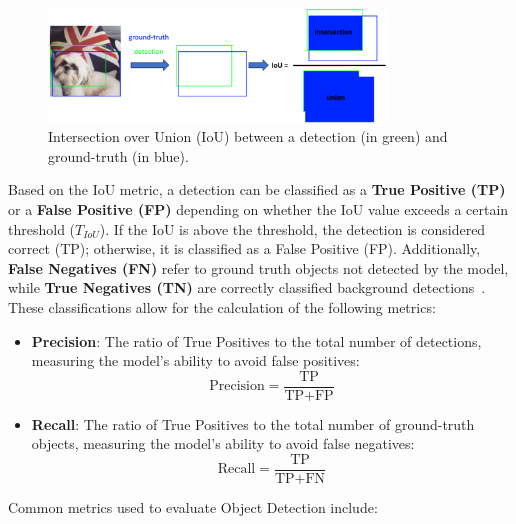 \documentclass[12pt,oneside]{book} %
\begin{document}
\begin{figure}[H]
    \centering
    \includegraphics[width=0.8\textwidth]{figures/iou.png}
    \caption{Intersection over Union (IoU) between a detection (in green) and ground-truth (in blue).~\cite{huggingface2023objectdetection}}\label{fig:iou-metric}
\end{figure}

Based on the IoU metric, a detection can be classified as a \textbf{True
    Positive (TP)} or a \textbf{False Positive (FP)} depending on whether the IoU
value exceeds a certain threshold ($T_{IoU}$). If the IoU is above the
threshold, the detection is considered correct (TP); otherwise, it is
classified as a False Positive (FP). Additionally, \textbf{False Negatives
    (FN)} refer to ground truth objects not detected by the model, while
\textbf{True Negatives (TN)} are correctly classified background
detections~\cite{huggingface2023objectdetection}. These classifications allow
for the calculation of the following metrics:

\begin{itemize}
    \item \textbf{Precision}: The ratio of True Positives to the total number of
          detections, measuring the model's ability to avoid false positives:
          \begin{equation}
              \text{Precision} = \frac{\text{TP}}{\text{TP} + \text{FP}}
          \end{equation}

    \item \textbf{Recall}: The ratio of True Positives to the total number of ground-truth objects, measuring the model's ability to avoid false negatives:
          \begin{equation}
              \text{Recall} = \frac{\text{TP}}{\text{TP} + \text{FN}}
          \end{equation}
\end{itemize}

Common metrics used to evaluate Object Detection include:
\end{document}
